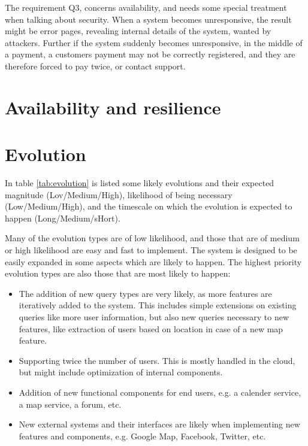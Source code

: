 The requirement Q3, concerns availability, and needs some special treatment
when talking about security. When a system becomes unresponsive, the result
might be error pages, revealing internal details of the system, wanted by
attackers. Further if the system suddenly becomes unresponsive, in the middle
of a payment, a customers payment may not be correctly registered, and they are
therefore forced to pay twice, or contact support.

\section{Availability and resilience}
\label{sec:avail-resil}


\section{Evolution}
\label{sec:evolution}
In table \ref{tab:evolution} is listed some likely evolutions and their
expected magnitude (Lov/Medium/High), likelihood of being necessary
(Low/Medium/High), and the timescale on which the evolution is expected to
happen (Long/Medium/sHort).

Many of the evolution types are of low likelihood, and those that are of medium
or high likelihood are easy and fast to implement. The system is designed to be
easily expanded in some aspects which are likely to happen. The highest
priority evolution types are also those that are most likely to happen:

\begin{itemize}
\item The addition of new query types are very likely, as more features are
iteratively added to the system. This includes simple extensions on existing
queries like more user information, but also new queries necessary to new
features, like extraction of users based on location in case of a new map
feature.  
\item Supporting twice the number of users. This is mostly handled in the
    cloud, but might include optimization of internal components.
\item Addition of new functional components for end users, e.g. a calender
service, a map service, a forum, etc.  \item New external systems and their
    interfaces are likely when implementing new features and components, e.g.
    Google Map, Facebook, Twitter, etc. 
\end{itemize}

